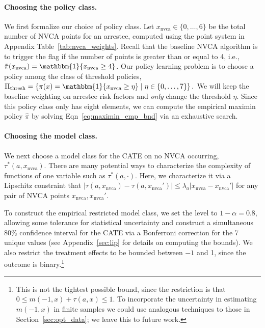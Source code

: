 \documentclass[12pt]{article}
\theoremstyle{definition}
\newcommand{\bbone}{\ensuremath{\mathbbm{1}}}
\newcommand{\<}{\langle}
\renewcommand{\>}{\rangle}
\begin{document}
\paragraph{Choosing the policy class.}
We first formalize our choice of policy class.  Let
$x_\text{nvca} \in \{0,\ldots,6\}$ be the total number of NVCA points for an
arrestee, computed using the point system in
Appendix Table~\ref{tab:nvca_weights}.  Recall that the baseline NVCA algorithm
is to trigger the flag if the number of points is greater than or
equal to 4, i.e.,
$\tilde{\pi}(x_\text{nvca}) = \bbone\{x_\text{nvca} \geq 4\}$.  Our
policy learning problem is to choose a policy among the class of
threshold policies,
$ 
  \Pi_\text{thresh} = \left\{ \pi(x) = \bbone\{x_\text{nvca} \geq \eta \} \; \vert \; \eta \in \{0,\ldots,7\}\right\}.
$
We will keep the baseline weighting on arrestee risk factors and
\emph{only} change the threshold $\eta$.
Since this policy class only has eight elements, we can compute the
empirical maximin policy $\hat{\pi}$ by solving
Eqn~\eqref{eq:maximin_emp_bnd} via an exhaustive search.

\paragraph{Choosing the model class.}
We next choose a model class for the CATE on no NVCA occurring,
$\tau^\ast(a, x_\text{nvca})$.  There are many potential ways to
characterize the complexity of functions of one variable such as
$\tau^\ast(a, \cdot)$. Here, we characterize it via a Lipschitz
constraint that
$\left|\tau(a, x_\text{nvca}) - \tau(a, x_\text{nvca}')\right| \leq
\lambda_a |x_\text{nvca} - x_\text{nvca}'|$ for any pair of NVCA
points $x_\text{nvca}, x_\text{nvca}'$.

To construct the empirical restricted model class, we set the level to
$1 - \alpha = 0.8$, allowing some tolerance for statistical
uncertainty and construct a simultaneous 80\% confidence interval for
the CATE via a Bonferroni correction for the 7 unique values (see
Appendix~\ref{sec:lip} for details on computing the bounds).  We also
restrict the treatment effects to be bounded between $-1$ and 1, since
the outcome is binary.\footnote{This is not the tightest possible
  bound, since the restriction is that
  $0 \leq m(-1,x) + \tau(a,x) \leq 1$. To incorporate the uncertainty
  in estimating $m(-1,x)$ in finite samples we could use analogous
  techniques to those in Section~\ref{sec:opt_data}; we leave this to
  future work.}
\end{document}
